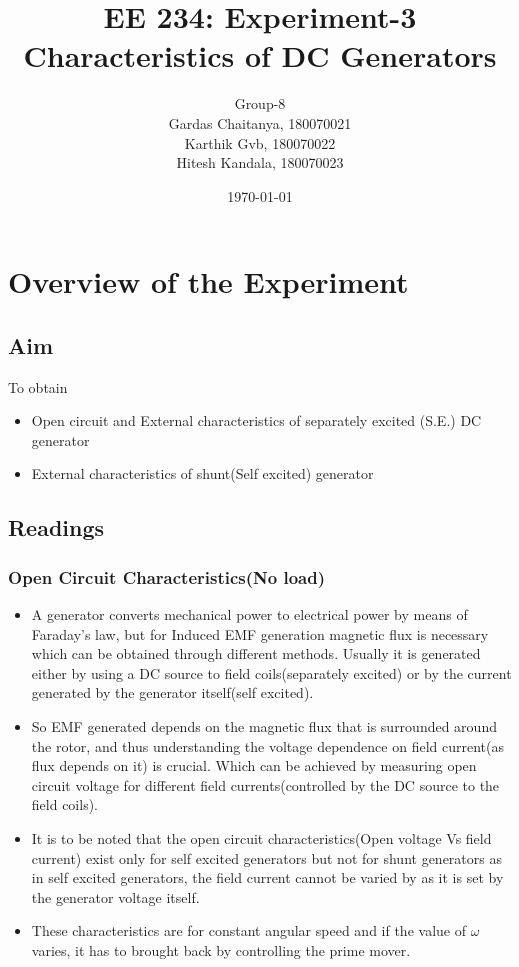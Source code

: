\documentclass[12pt]{article}
\title{EE 234: Experiment-3\\
Characteristics of DC Generators}
\author{Group-8 \\Gardas Chaitanya, 180070021  \\
Karthik Gvb, 180070022 \\
Hitesh Kandala, 180070023}
\date{\today}
\begin{document}
  \maketitle
  
    \section{Overview of the Experiment}
        \subsection{Aim}
            To obtain
            \begin{itemize}
                \item Open circuit and External characteristics of separately excited (S.E.) DC generator
                \item External characteristics of shunt(Self excited) generator
            \end{itemize}
        \subsection{Readings}
            \subsubsection{Open Circuit Characteristics(No load)}
                \begin{itemize}
                    \item A generator converts mechanical power to electrical power by means of Faraday's law, but for Induced EMF generation magnetic flux is necessary which can be obtained through different methods. Usually it is generated either by using a DC source to field coils(separately excited) or by the current generated by the generator itself(self excited).
                    \item So EMF generated depends on the magnetic flux that is surrounded around the rotor, and thus understanding the voltage dependence on field current(as flux depends on it) is crucial. Which can be achieved by measuring open circuit voltage for different field currents(controlled by the DC source to the field coils).
                    \item It is to be noted that the open circuit characteristics(Open voltage Vs field current) exist only for self excited generators but not for shunt generators as in self excited generators, the field current cannot be varied by as it is set by the generator voltage itself.
                    \item These characteristics are for constant angular speed and if the value of $\omega$ varies, it has to brought back by controlling the prime mover. 
                    
                \end{itemize}
                
\end{document}
